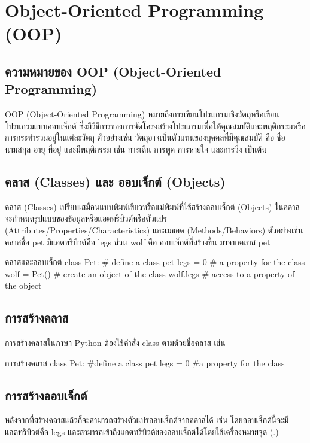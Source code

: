 \chapter{Object-Oriented Programming (OOP)}
\section{ความหมายของ OOP (Object-Oriented Programming)}

OOP (Object-Oriented Programming) หมายถึงการเขียนโปรแกรมเชิงวัตถุหรือเขียนโปรแกรมแบบออบเจ็กต์ ซึ่งมีวิธีการของการจัดโครงสร้างโปรแกรมเพื่อให้คุณสมบัติและพฤติกรรมหรือการกระทำรวมอยู่ในแต่ละวัตถุ \cite{Mar11} ตัวอย่างเช่น วัตถุอาจเป็นตัวแทนของบุคคลที่มีคุณสมบัติ คือ ชื่อ นามสกุล อายุ ที่อยู่ และมีพฤติกรรม เช่น การเดิน การพูด การหายใจ และการวิ่ง เป็นต้น

\section{คลาส (Classes) และ ออบเจ็กต์ (Objects)}

คลาส (Classes) เปรียบเสมือนแบบพิมพ์เขียวหรือแม่พิมพ์ที่ใช้สร้างออบเจ็กต์ (Objects) ในคลาสจะกำหนดรูปแบบของข้อมูลหรือแอตทริบิวต์หรือตัวแปร (Attributes/Properties/Characteristics) และเมธอด (Methods/Behaviors) ตัวอย่างเช่น คลาสชื่อ pet มีแอตทริบิวต์คือ legs ส่วน wolf คือ ออบเจ็กต์ที่สร้างขึ้น มาจากคลาส pet 

\begin{codelist}{คลาสและออบเจ็กต์}{}
class Pet: # define a class pet
    legs = 0  # a property for the class
    wolf = Pet() # create an object of the class 
    wolf.legs # access to a property of the object
\end{codelist}

\section{การสร้างคลาส}

การสร้างคลาสในภาษา Python ต้องใช้คำสั่ง class ตามด้วยชื่อคลาส เช่น

\begin{codelist}{การสร้างคลาส}{}
class Pet: #define a class pet
    legs = 0 #a property for the class
\end{codelist}


\section{การสร้างออบเจ็กต์}

หลังจากที่สร้างคลาสแล้วก็จะสามารถสร้างตัวแปรออบเจ็กต์จากคลาสได้ เช่น  โดยออบเจ็กต์นี้จะมีแอตทริบิวต์คือ legs และสามารถเข้าถึงแอตทริบิวต์ของออบเจ็กต์ได้โดยใช้เครื่องหมายจุด (.) 

